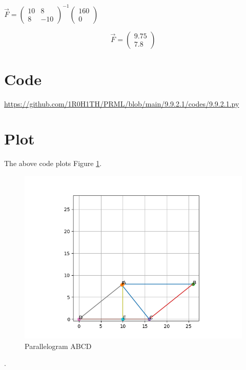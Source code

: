 \documentclass[letterpaper,12pt]{article}
\begin{document}
\begin{center}
    $\Vec{F} = \begin{pmatrix}10 & 8 \\ 8 & -10 \end{pmatrix}^{-1}\begin{pmatrix} 160 \\ 0 \end{pmatrix}$
\end{center}
\begin{equation}
    \Vec{F} = \begin{pmatrix}9.75 \\ 7.8\end{pmatrix}
\end{equation}

\clearpage

\section{Code}
\url{https://github.com/1R0H1TH/PRML/blob/main/9.9.2.1/codes/9.9.2.1.py}

\section{Plot}
The above code plots Figure \ref{fig:fig2}.
\begin{figure}[!ht]
\centering
\includegraphics[width=0.75\columnwidth]{figs/Figure_1.png}
\caption{Parallelogram ABCD}
\label{fig:fig2}
\end{figure}.
\end{document}
